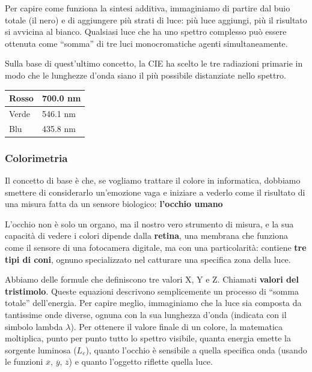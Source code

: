\documentclass[
]{article}
\begin{document}
Per capire come funziona la sintesi additiva, immaginiamo di partire dal buio totale (il nero) e di aggiungere più strati di luce: più luce aggiungi, più il risultato si avvicina al bianco.
Qualsiasi luce che ha uno spettro complesso può essere ottenuta come ``somma'' di tre luci monocromatiche agenti simultaneamente.

Sulla base di quest'ultimo concetto, la CIE ha scelto le tre radiazioni primarie in modo che le lunghezze d'onda siano il più possibile distanziate nello spettro.

\begin{longtable}[]{@{}ll@{}}
\toprule\noalign{}
Rosso & 700.0 nm \\
\midrule\noalign{}
\endhead
\bottomrule\noalign{}
\endlastfoot
Verde & 546.1 nm \\
Blu & 435.8 nm \\
\end{longtable}

\hypertarget{colorimetria}{%
\subsubsection{Colorimetria}\label{colorimetria}}

Il concetto di base è che, se vogliamo trattare il colore in informatica, dobbiamo smettere di considerarlo un'emozione vaga e iniziare a vederlo come il risultato di una misura fatta da un sensore biologico: \textbf{l'occhio umano}

L'occhio non è solo un organo, ma il nostro vero strumento di misura, e la sua capacità di vedere i colori dipende dalla \textbf{retina}, una membrana che funziona come il sensore di una fotocamera digitale, ma con una particolarità: contiene \textbf{tre tipi di coni}, ognuno specializzato nel catturare una specifica zona della luce.

Abbiamo delle formule che definiscono tre valori X, Y e Z. Chiamati \textbf{valori del tristimolo}. Queste equazioni descrivono semplicemente un processo di ``somma totale'' dell'energia. Per capire meglio, immaginiamo che la luce sia composta da tantissime onde diverse, ognuna con la sua lunghezza d'onda (indicata con il simbolo lambda \(\lambda\)). Per ottenere il valore finale di un colore, la matematica moltiplica, punto per punto tutto lo spettro visibile, quanta energia emette la sorgente luminosa (\(L_{e}\)), quanto l'occhio è sensibile a quella specifica onda (usando le funzioni \(\overline{x}\), \(\overline{y}\), \(\overline{z}\)) e quanto l'oggetto riflette quella luce.
\end{document}
